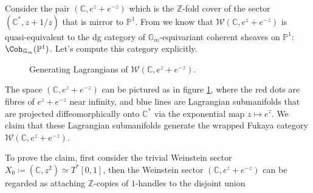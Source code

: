 \begin{exmp}\label{exmp:mirror-to-Coh-G-P1}
    Consider the pair $(\mathbb{C}, e^z+e^{-z})$ which is the $\mathbb{Z}$-fold cover of the sector $(\mathbb{C}^{\ast},z+1/z)$ that is mirror to $\mathbb{P}^1$. From \cite{FLTZ12} we know that $\mathcal{W} (\mathbb{C},e^z+e^{-z})$ is quasi-equivalent to the dg category of $\mathbb{G}_m$-equivariant coherent sheaves on $\mathbb{P}^1$: $\Coh_{\mathbb{G}_m} (\mathbb{P}^1)$. Let's compute this category explicitly.\par
    \begin{figure}[ht]
        \centering
        \caption{Generating Lagrangians of $\mathcal{W} (\mathbb{C}, e^z+e^{-z})$.}\label{fig:generating-Lag-equiv-P1}
    \end{figure}
    The space $(\mathbb{C},e^z+e^{-z})$ can be pictured as in figure \ref{fig:generating-Lag-equiv-P1}, where the red dots are fibres of $e^z+e^{-z}$ near infinity, and blue lines are Lagrangian submanifolds that are projected diffeomorphically onto $\mathbb{C}^{\ast}$ via the exponential map $z\mapsto e^z$. We claim that these Lagrangian submanifolds generate the wrapped Fukaya category $\mathcal{W} (\mathbb{C},e^z+e^{-z})$.\par
    To prove the claim, first consider the trivial Weinstein sector $X_0\coloneqq(\mathbb{C},z^2) \simeq T^{\ast} [0,1]$, then the Weinstein sector $(\mathbb{C},e^z+e^{-z})$ can be regarded as attaching $\mathbb{Z}$-copies of $1$-handles to the disjoint union \[
\]
\end{exmp}
